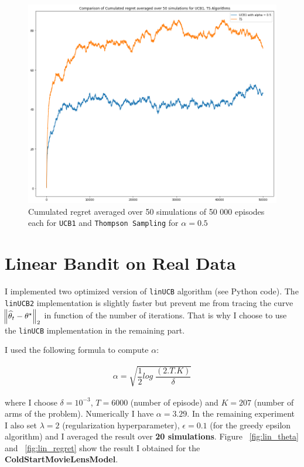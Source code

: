 \documentclass[11pt]{article}
\numberwithin{figure}{section} %
\begin{document}
\begin{figure}[H]
		\centering
		\includegraphics[width=1\linewidth]{images/non_ber_arms}
		\caption{Cumulated regret averaged over 50 simulations of 50 000 episodes each for \texttt{UCB1} and \texttt{Thompson Sampling} for $\alpha = 0.5$}
		\label{fig:UCB1_v_TS_GEN}
\end{figure}


\section{Linear Bandit on Real Data}
I implemented two optimized version of \texttt{linUCB} algorithm (see Python code). The \texttt{linUCB2} implementation is slightly faster but prevent me
from tracing the curve $\norm{\widehat{\theta}_t - \theta^{\star}}_2$ in function of the number of iterations. That is why I choose to use the \texttt{linUCB}
implementation in the remaining part.

I used the following formula to compute $\alpha$:

\begin{align*}
\alpha = \sqrt{\dfrac{1}{2} log \; \dfrac{(2 . T . K)}{\delta}}
\end{align*}

where I choose $\delta = 10^{-3}$,  $T = 6000$ (number of episode) and $K= 207$ (number of arms of the problem). Numerically I have $\alpha = 3.29$. In the remaining experiment
I also set $\lambda = 2$ (regularization hyperparameter), $\epsilon = 0.1$ (for the greedy epsilon algorithm) and I averaged the result over \textbf{20 simulations}. Figure ~\ref{fig:lin_theta} and ~\ref{fig:lin_regret} show the result I obtained for the \textbf{ColdStartMovieLensModel}.
\end{document}
